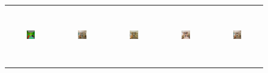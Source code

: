 \begin{figure}[]
\begin{tabular} {cc|cc|c}
\includegraphics[width=0.1932\textwidth,height=0.96in]{Images/Rec/ADE/label/ADE_val_00000967.png} & \includegraphics[width=0.1932\textwidth,height=0.96in]{Images/Rec/ADE/gt/ADE_val_00000967.jpg} &
\includegraphics[width=0.1932\textwidth,height=0.96in]{Images/Rec/ADE/pix2pixhd/ADE_val_00000967.jpg} &   \includegraphics[width=0.1932\textwidth,height=0.96in]{Images/Rec/ADE/spade/ADE_val_00000967.jpg} &  \includegraphics[width=0.1932\textwidth,height=0.96in]{Images/Rec/ADE/ours/ADE_val_00000967.png} \\



\end{tabular}
\end{figure}

